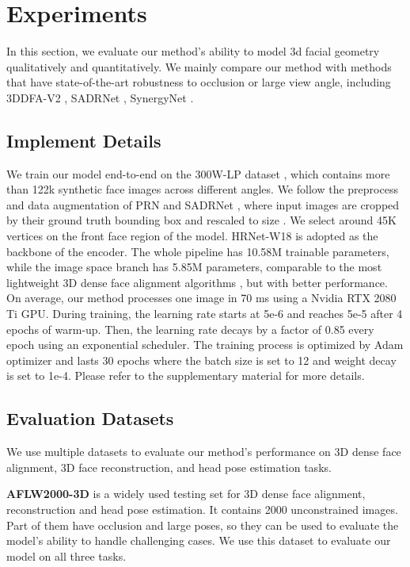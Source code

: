 \documentclass[10pt,twocolumn,letterpaper]{article}
\begin{document}
\section{Experiments}
\label{sec:exper}

In this section, we evaluate our method's ability to model 3d facial geometry  qualitatively and quantitatively.
We mainly compare our method with methods that have state-of-the-art robustness to occlusion or large view angle, including 3DDFA-V2 \cite{guo2020towards}, SADRNet \cite{ruan2021sadrnet}, SynergyNet \cite{wu2021synergy}. 


\subsection{Implement Details}

We train our model end-to-end on the 300W-LP dataset \cite{zhu2016face}, which contains more than 122k synthetic face images across different angles. 
We follow the preprocess and data augmentation of PRN \cite{feng2018prn} and SADRNet \cite{ruan2021sadrnet}, where input images are cropped by their ground truth bounding box and rescaled to size . We select around 45K vertices on the front face region of the model. 
HRNet-W18 \cite{SunXLW19} is adopted as the backbone of the encoder. The whole pipeline has 10.58M trainable parameters, while the image space branch has 5.85M parameters, comparable to the most lightweight 3D dense face alignment algorithms \cite{wu2021synergy, guo2020towards}, but with better performance. 
On average, our method processes one image in 70 ms using a Nvidia RTX 2080 Ti GPU.
During training, the learning rate starts at 5e-6 and reaches 5e-5 after 4 epochs of warm-up. Then, the learning rate decays by a factor of 0.85 every epoch using an exponential scheduler. The training process is optimized by Adam optimizer and lasts 30 epochs where the batch size is set to 12 and weight decay is set to 1e-4. Please refer to the supplementary material for more details.



\subsection{Evaluation Datasets}

We use multiple datasets to evaluate our method's performance on 3D dense face alignment, 3D face reconstruction, and head pose estimation tasks. 

\textbf{AFLW2000-3D} \cite{zhu2016face} is a widely used testing set for 3D dense face alignment, reconstruction and head pose estimation. It contains 2000 unconstrained images. Part of them have occlusion and large poses, so they can be used to evaluate the model's ability to handle challenging cases. We use this dataset to evaluate our model on all three tasks.
\end{document}
